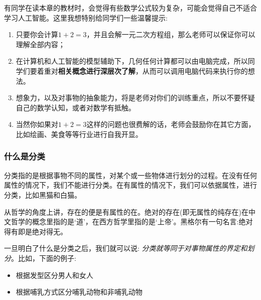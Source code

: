 \documentclass[12pt]{article}
\numberwithin{figure}{section}
\newenvironment{fullmodel}{
			\smallskip\noindent
			\begin{minipage}{\textwidth+\marginparwidth+\marginparsep}\smallskip\smallskip}
			{\smallskip\smallskip\end{minipage}\vspace{.1in}
			}
\numberwithin{equation}{section}
\begin{document}
\begin{fullmodel}
	\begin{tcolorbox}[title=没有你学不会的，只有老师教不懂的。]
		有同学在读本章的教材时，会觉得有些数学公式较为复杂，可能会觉得自己不适合学习人工智能。这里我想特别给同学们一些温馨提示:
		\begin{enumerate}
			\item 只要你会计算$1+2=3$，并且会解一元二次方程组，那么老师可以保证你可以理解全部内容；
			\item 在计算机和人工智能的模型辅助下，几何任何计算都可以由电脑完成，所以同学们要着重对\textbf{相关概念进行深层次了解}，从而可以调用电脑代码来执行你的想法。
			\item 想象力，以及对事物的抽象能力，将是老师对你们的训练重点，所以不要怀疑自己的数学认知，或者对数学有抵触。
			\item 当然你如果对$1+2=3$这样的问题也很费解的话，老师会鼓励你在其它方面，比如绘画、美食等等行业进行自我开显。
		\end{enumerate}
	\end{tcolorbox}
\end{fullmodel}


\subsubsection{什么是分类}

\begin{definition}
	分类指的是根据事物不同的属性，对某个或一些物体进行划分的过程。在没有任何属性的情况下，我们不能进行分类。在有属性的情况下，我们可以依据属性，进行分类，比如黑猫和白猫。
\end{definition}

\begin{remark}
从哲学的角度上讲，存在的便是有属性的在。绝对的存在(即无属性的纯存在)在中文哲学的概念里指的是`道’，在西方哲学里指的是`上帝'。黑格尔有一句名言:绝对得有即是绝对得无。	
\end{remark}

\begin{tcolorbox}[title=分类等同于属性界定]
	一旦明白了什么是分类之后，我们就可以说: \textit{分类就等同于对事物属性的界定和划分}。比如，下面的例子:
	\begin{itemize}
		\item 根据发型区分男人和女人
		\item 根据哺乳方式区分哺乳动物和非哺乳动物
	\end{itemize}
\end{tcolorbox}
\end{document}
